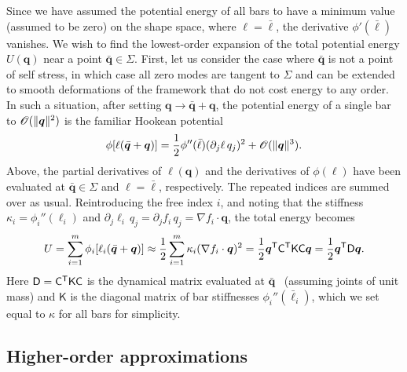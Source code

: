 Since we have assumed the potential energy of all bars to have a minimum value (assumed to be zero) on the shape space, where $\ell = \bar{\ell}$, the derivative $\phi'(\bar{\ell})$ vanishes.
We wish to find the lowest-order expansion of the total potential energy $U(\bm{q})$ near a point $\bar{\bm{q}} \in \Sigma$.
First, let us consider the case where $\bar{\bm{q}}$ is not a point of self stress, in which case all zero modes are tangent to $\Sigma$ and can be extended to smooth deformations of the framework that do not cost energy to any order.
In such a situation, after setting $\bm{q} \to \bar{\bm{q}} + \bm{q}$, the potential energy of a single bar to $\mathscr{O}(\lVert\bm{q}\rVert^2)$ is the familiar Hookean potential
%
\begin{equation}
  \phi[\ell(\bar{\bm{q}} + \bm{q})] =  \frac{1}{2}\phi''(\bar{\ell})(\partial_j \ell\,q_j)^2 + \mathscr{O}(\lVert\bm{q}\rVert^3).
\end{equation}
%
Above, the partial derivatives of $\ell(\bm{q})$ and the derivatives of $\phi(\ell)$ have been evaluated at $\bar{\bm{q}} \in \Sigma$ and $\ell = \bar{\ell}$, respectively.
The repeated indices are summed over as usual.
Reintroducing the free index $i$, and noting that the stiffness $\kappa_{i} = \phi_{i}''(\ell_{i})$ and $\partial_{j}\ell_{i}\,q_{j} = \partial_{j}f_{i}\,q_{j} = \nabla f_{i}\cdot\bm{q}$, the total energy becomes
%
\begin{equation}
  U = \sum_{i=1}^m \phi_i[\ell_i(\bar{\bm{q}} + \bm{q})] \approx \frac{1}{2} \sum_{i=1}^m \kappa_i (\nabla f_i\cdot\bm{q})^2 = \frac{1}{2}\bm{q}^\mathsf{T}\mathsf{C}^\mathsf{T}\mathsf{K}\mathsf{C}\bm{q} = \frac{1}{2}\bm{q}^\mathsf{T}\mathsf{D}\bm{q}.
  \label{sm:eq:regenergy}
\end{equation}
%
Here $\mathsf{D} = \mathsf{C}^\mathsf{T}\mathsf{K}\mathsf{C}$ is the dynamical matrix evaluated at $\bar{\bm{q}}$~\cite{lubensky2015} (assuming joints of unit mass) and $\mathsf{K}$ is the diagonal matrix of bar stiffnesses $\phi_{i}''(\bar{\ell}_{i})$, which we set equal to $\kappa$ for all bars for simplicity.

\subsection{Higher-order approximations}

